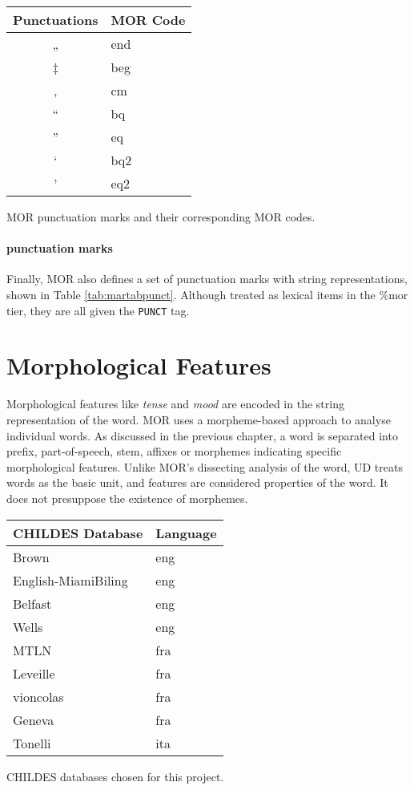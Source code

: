 \begin{margintable}[1\baselineskip] %
\begin{tabularx}{0.85\textwidth}{@{}cl@{}}
\toprule
Punctuations & MOR Code\\\midrule
„ & end\\
‡ & beg\\
, & cm\\
“ & bq\\
” & eq\\
‘ & bq2\\
’ & eq2\\\bottomrule
\end{tabularx}
\caption{\label{tab:martabpunct}MOR punctuation marks and their corresponding MOR codes.}
\footnotesize
\end{margintable}

\paragraph{punctuation marks}
Finally, MOR also defines a set of punctuation marks with string representations, shown in Table \ref{tab:martabpunct}. Although treated as lexical items in the \%mor tier, they are all given the \texttt{PUNCT} tag.

\section{Morphological Features}
\label{sec:feats}

Morphological features like \emph{tense} and \emph{mood} are encoded in the string representation of the word. MOR uses a morpheme-based approach to analyse individual words. As discussed in the previous chapter, a word is separated into prefix, part-of-speech, stem, affixes or morphemes indicating specific morphological features. Unlike MOR's dissecting analysis of the word, UD treats words as the basic unit, and features are considered properties of the word. It does not presuppose the existence of morphemes.

\begin{margintable}[1\baselineskip]
\begin{tabularx}{1\textwidth}{@{}ll@{}}
\toprule
\textbf{CHILDES Database} & \textbf{Language}\\ \midrule
	Brown & eng\\
	English-MiamiBiling & eng\\
	Belfast & eng\\
	Wells & eng\\
	MTLN & fra\\
	Leveille & fra\\
	vioncolas & fra\\
	Geneva & fra\\
	Tonelli & ita\\\bottomrule
\end{tabularx}
\caption{\label{tab:martabdb}CHILDES databases chosen for this project.}
\footnotesize
\end{margintable}

